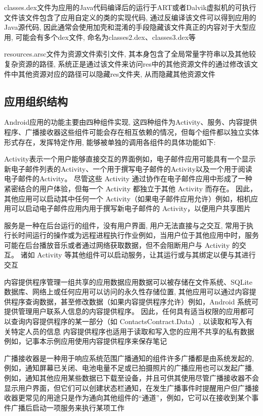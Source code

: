 classes.dex文件为应用的Java代码编译后的运行于ART或者Dalvik虚拟机的可执行文件\juhao 该文件包含了应用自定义的类的实现代码, 通过反编译该文件可以得到应用的Java源代码, 因此通常会使用加壳和混淆的手段隐藏该文件真正的内容\juhao 对于大型应用, 可能会有多个dex文件, 命名为classes2.dex、classes3.dex等\juhao

resources.arsc文件为资源文件索引文件, 其本身包含了全局常量字符串以及其他较复杂资源的路径, 系统正是通过该文件来访问res中的其他资源文件的\juhao 通过修改该文件中其他资源对应的路径可以隐藏res文件夹, 从而隐藏其他资源文件\juhao

\subsection{应用组织结构}
Android应用的功能主要由四种组件实现, 这四种组件为Activity、服务、内容提供程序、广播接收器\juhao 这些组件可能会存在相互依赖的情况，但每个组件都以独立实体形式存在，发挥特定作用, 能够被单独的调用\juhao 各组件的具体功能如下:

Activity表示一个用户能够直接交互的界面\juhao 例如，电子邮件应用可能具有一个显示新电子邮件列表的Activity、一个用于撰写电子邮件的Activity以及一个用于阅读电子邮件的Activity。 尽管这些 Activity 通过协作在电子邮件应用中形成了一种紧密结合的用户体验，但每一个 Activity 都独立于其他 Activity 而存在。 因此，其他应用可以启动其中任何一个 Activity（如果电子邮件应用允许）\juhao 例如，相机应用可以启动电子邮件应用内用于撰写新电子邮件的 Activity，以便用户共享图片\juhao

服务是一种在后台运行的组件，没有用户界面, 用户无法直接与之交互, 常用于执行长时间运行的操作或为远程进程执行作业\juhao 例如，当用户位于其他应用中时，服务可能在后台播放音乐或者通过网络获取数据，但不会阻断用户与 Activity 的交互。 诸如 Activity 等其他组件可以启动服务，让其运行或与其绑定以便与其进行交互\juhao

内容提供程序管理一组共享的应用数据\juhao 应用数据可以被存储在文件系统、SQLite 数据库、网络上或任何应用可以访问的永久性存储位置, 其他应用可以通过内容提供程序查询数据，甚至修改数据（如果内容提供程序允许）\juhao 例如，Android 系统可提供管理用户联系人信息的内容提供程序。 因此，任何具有适当权限的应用都可以查询内容提供程序的某一部分（如 ContactsContract.Data）, 以读取和写入有关特定人员的信息\juhao
内容提供程序也适用于读取和写入您的应用不共享的私有数据\juhao 例如，记事本示例应用使用内容提供程序来保存笔记\juhao

广播接收器是一种用于响应系统范围广播通知的组件\juhao 许多广播都是由系统发起的, 例如，通知屏幕已关闭、电池电量不足或已拍摄照片的广播\juhao 应用也可以发起广播, 例如，通知其他应用某些数据已下载至设备，并且可供其使用\juhao 尽管广播接收器不会显示用户界面，但它们可以创建状态栏通知，在发生广播事件时提醒用户\juhao 但广播接收器更常见的用途只是作为通向其他组件的“通道”，例如，它可以在接收到某个事件广播后启动一项服务来执行某项工作\juhao

